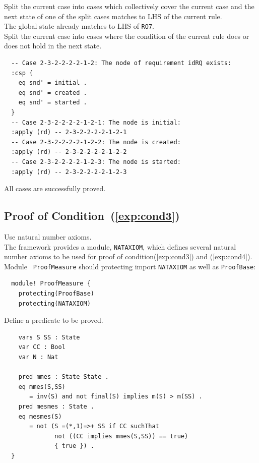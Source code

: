 \documentclass[12pt]{report}
\begin{document}
 Split the current case into cases which
collectively cover the current case and the next state of one of the split cases
matches to LHS of the current rule. \\
The global state already matches to LHS of {\tt RO7}.\\

 Split the current case into cases where the
condition of the current rule does or does not hold in the next state.
\small
\begin{verbatim}
  -- Case 2-3-2-2-2-2-1-2: The node of requirement idRQ exists:
  :csp {
    eq snd' = initial .
    eq snd' = created .
    eq snd' = started .
  }
  -- Case 2-3-2-2-2-2-1-2-1: The node is initial:
  :apply (rd) -- 2-3-2-2-2-2-1-2-1
  -- Case 2-3-2-2-2-2-1-2-2: The node is created:
  :apply (rd) -- 2-3-2-2-2-2-1-2-2
  -- Case 2-3-2-2-2-2-1-2-3: The node is started:
  :apply (rd) -- 2-3-2-2-2-2-1-2-3
\end{verbatim}
\normalsize
All cases are successfully proved.

\subsection{Proof of Condition~(\ref{exp:cond3})}
\label{sec:TOSCAmesmes}
 Use natural number axioms. \\
The framework provides a module, {\tt NATAXIOM}, which defines several
natural number axioms to be used for proof of
condition(\ref{exp:cond3}) and (\ref{exp:cond4}).  Module {\tt
  ProofMeasure} should protecting import {\tt NATAXIOM} as well as
{\tt ProofBase}:
\small
\begin{verbatim}
  module! ProofMeasure {
    protecting(ProofBase)
    protecting(NATAXIOM)
\end{verbatim}
\normalsize

 Define a predicate to be proved.
\small
\begin{verbatim}
    vars S SS : State
    var CC : Bool
    var N : Nat
      
    pred mmes : State State .
    eq mmes(S,SS)
       = inv(S) and not final(S) implies m(S) > m(SS) .
    pred mesmes : State .
    eq mesmes(S)
       = not (S =(*,1)=>+ SS if CC suchThat
              not ((CC implies mmes(S,SS)) == true)
              { true }) .
  }
\end{verbatim}
\normalsize
\end{document}

